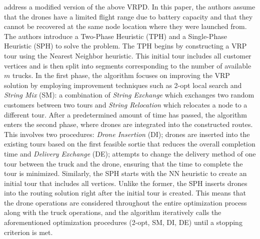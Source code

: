 \documentclass{article}
\begin{document}
	\citeauthor{Schermer2018} \cite{Schermer2018} address a modified version of the above VRPD. In this paper, the authors assume that the drones have a limited flight range due to battery capacity and that they cannot be recovered at the same node location where they were launched from. The authors introduce a Two-Phase Heuristic (TPH) and a Single-Phase Heuristic (SPH) to solve the problem. The TPH begins by constructing a VRP tour using the Nearest Neighbor heuristic. This initial tour includes all customer vertices and is then split into segments corresponding to the number of available $m$ trucks. In the first phase, the algorithm focuses on improving the VRP solution by employing improvement techniques such as 2-opt local search and \textit{String Mix} (SM): a combination of \textit{String Exchange} which exchanges two random customers between two tours and \textit{String Relocation} which relocates a node to a different tour. After a predetermined amount of time has passed, the algorithm enters the second phase, where drones are integrated into the constructed routes. This involves two procedures: \textit{Drone Insertion} (DI); drones are inserted into the existing tours based on the first feasible sortie that reduces the overall completion time and \textit{Delivery Exchange} (DE); attempts to change the delivery method of one tour between the truck and the drone, ensuring that the time to complete the tour is minimized. Similarly, the SPH starts with the NN heuristic to create an initial tour that includes all vertices. Unlike the former, the SPH inserts drones into the routing solution right after the initial tour is created. This means that the drone operations are considered throughout the entire optimization process along with the truck operations, and the algorithm iteratively calls the aforementioned optimization procedures (2-opt, SM, DI, DE) until a stopping criterion is met.
	\par 
\end{document}
